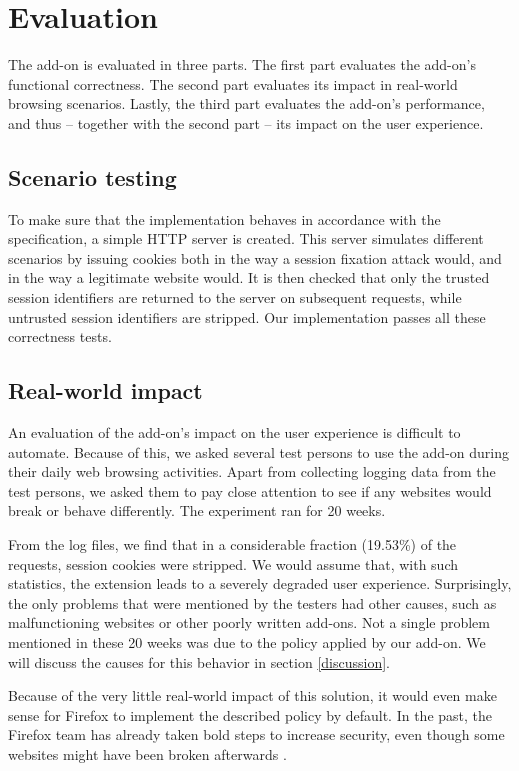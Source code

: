 \section{Evaluation}\label{evaluation}

The add-on is evaluated in three parts. The first part evaluates the add-on's functional correctness. The second part evaluates its impact in real-world browsing scenarios. Lastly, the third part evaluates the add-on's performance, and thus -- together with the second part -- its impact on the user experience.

\subsection{Scenario testing}

To make sure that the implementation behaves in accordance with the specification, a simple HTTP server is created. This server simulates different scenarios by issuing cookies both in the way a session fixation attack would, and in the way a legitimate website would. It is then checked that only the trusted session identifiers are returned to the server on subsequent requests, while untrusted session identifiers are stripped. Our implementation passes all these correctness tests.

\subsection{Real-world impact}

An evaluation of the add-on's impact on the user experience is difficult to automate. Because of this, we asked several test persons to use the add-on during their daily web browsing activities. Apart from collecting logging data from the test persons, we asked them to pay close attention to see if any websites would break or behave differently. The experiment ran for 20 weeks.

From the log files, we find that in a considerable fraction (19.53\%) of the requests, session cookies were stripped. We would assume that, with such statistics, the extension leads to a severely degraded user experience. Surprisingly, the only problems that were mentioned by the testers had other causes, such as malfunctioning websites or other poorly written add-ons. Not a single problem mentioned in these 20 weeks was due to the policy applied by our add-on. We will discuss the causes for this behavior in section \ref{discussion}.

Because of the very little real-world impact of this solution, it would even make sense for Firefox to implement the described policy by default. In the past, the Firefox team has already taken bold steps to increase security, even though some websites might have been broken afterwards \cite{Singh2010,MozillaXmlHttp,Bonne2011}.

